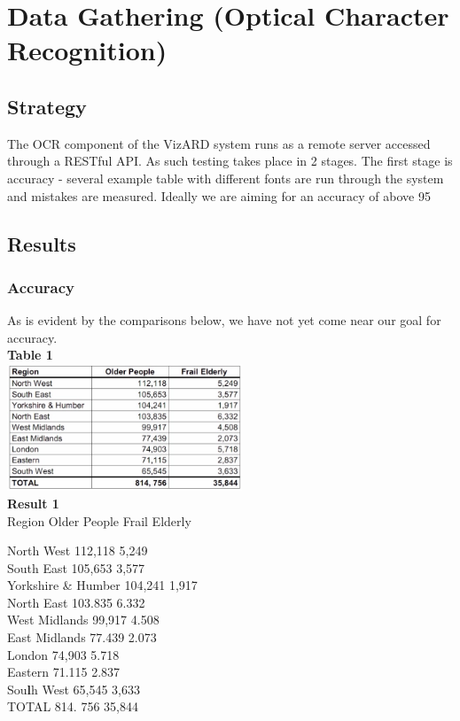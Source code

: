 \documentclass[a4paper,12pt]{article}
\begin{document}
\section{Data Gathering (Optical Character Recognition)}
	\subsection{Strategy} The OCR component of the VizARD system runs as a remote server accessed through a RESTful API. As such testing takes place in 2 stages. The first stage is accuracy - several example table with different fonts are run through the system and mistakes are measured. Ideally we are aiming for an accuracy of above 95%
	
	\subsection{Results}
		\subsubsection{Accuracy}
		As is evident by the comparisons below, we have not yet come near our goal for accuracy.\\
		
		\textbf {Table 1}\\
		\includegraphics[width=7cm]{Images/Tables/table.jpg}\\
		
		\textbf{Result 1}\\
		Region Older People Frail Elderly

		North West 112,118 5,249\\
		South East 105,653 3,577\\
		Yorkshire \& Humber 104,241 1,917\\
		North East 103.835 6.332\\
		West Midlands 99,917 4.508\\
		East Midlands 77.439 2.073\\
		London 74,903 5.718\\
		Eastern 71.115 2.837\\
		Sou\textbf{l}h West 65,545 3,633\\
		TOTAL 814. 756 35,844\\
		
\end{document}
